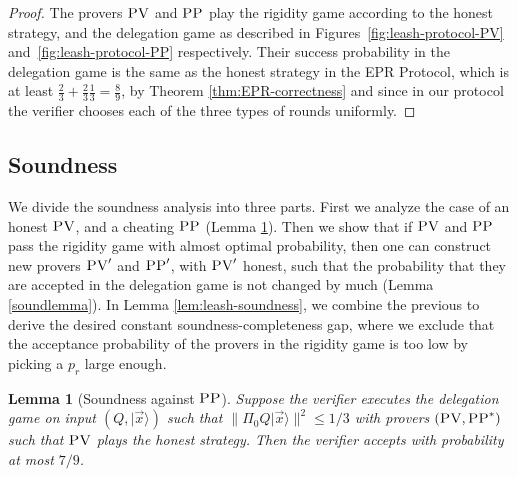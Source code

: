 \documentclass[11pt]{article}
\newtheorem{lemma}[theorem]{Lemma}
\newcommand{\ket}[1]{|#1\rangle}
\newcommand{\pv}{\textsc{PV}}
\newcommand{\pp}{\textsc{PP}}
\begin{document}
\begin{proof}
The provers $\pv$ and $\pp$ play the rigidity game according to the honest strategy, and the delegation game as described in Figures~\ref{fig:leash-protocol-PV} and~\ref{fig:leash-protocol-PP} respectively. Their success probability in the delegation game is the same as the honest strategy in the EPR Protocol, which is at least $\frac{2}{3}+\frac{2}{3}\frac{1}{3}=\frac{8}{9}$, by Theorem \ref{thm:EPR-correctness} and since in our protocol the verifier chooses each of the three types of rounds uniformly.
\end{proof}

\subsection{Soundness}



We divide the soundness analysis into three parts. First we analyze the case of an honest $\pv$, and a cheating $\pp$ (Lemma \ref{lem:soundness-leash-pp}). Then we show that if $\pv$ and $\pp$ pass the rigidity game with almost optimal probability, then one can construct new provers $\pv'$ and $\pp'$, with $\pv'$ honest, such that the probability that they are accepted in the delegation game is not changed by much (Lemma \ref{soundlemma}). In Lemma \ref{lem:leash-soundness}, we combine the previous to derive the desired constant soundness-completeness gap, where we exclude that the acceptance probability of the provers in the rigidity game is too low by picking a $p_r$ large enough.


\begin{lemma}[Soundness against $\pp$]\label{lem:soundness-leash-pp}
Suppose the verifier executes the delegation  game on input $(Q,\ket{\vec{x}})$ such that $\|\Pi_0 Q\ket{\vec{x}}\|^2 \leq 1/3$ with provers $(\pv,\pp^*)$ such that $\pv$ plays the honest strategy. Then the verifier accepts with probability at most $7/9$. 
\end{lemma}
\end{document}
